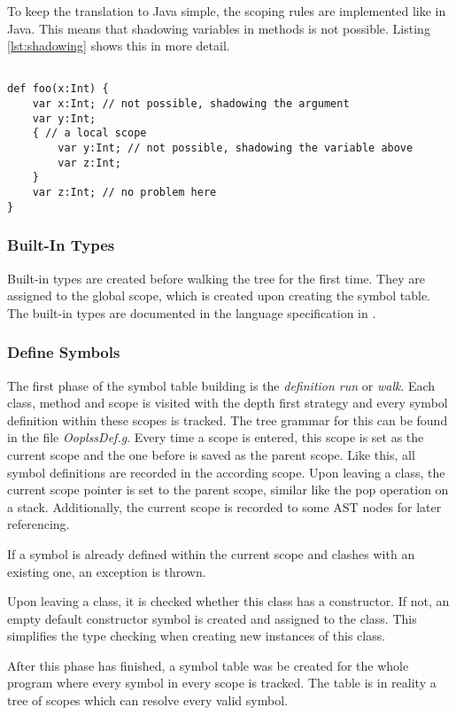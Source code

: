 To keep the translation to Java simple, the scoping rules are implemented
like in Java. This means that shadowing variables in methods is not possible.
Listing \ref{lst:shadowing} shows this in more detail.

\begin{lstlisting}[float=ht,language=ooplss,caption=Shadowing variables,label=lst:shadowing]

def foo(x:Int) {
	var x:Int; // not possible, shadowing the argument
	var y:Int;
	{ // a local scope
		var y:Int; // not possible, shadowing the variable above
		var z:Int;
	}
	var z:Int; // no problem here
}
\end{lstlisting}

\subsubsection{Built-In Types}
Built-in types are created before walking the tree for the first time.
They are assigned to the global scope, which is created upon creating the symbol
table. The built-in types are documented in the language specification in
.

\subsubsection{Define Symbols}
The first phase of the symbol table building is the \emph{definition run}
or \emph{walk}. Each class, method and scope is visited with the
depth first strategy and every symbol definition within these scopes
is tracked. The tree grammar for this can be found in the file
\emph{OoplssDef.g}. Every time a scope is entered, this scope is set
as the current scope and the one before is saved as the parent scope.
Like this, all symbol definitions are recorded in the according scope.
Upon leaving a class, the current scope pointer is set to
the parent scope, similar like the pop operation on a stack.
Additionally, the current scope is recorded to some AST nodes for later
referencing.

If a symbol is already defined within the current scope and clashes with
an existing one, an exception is thrown.

Upon leaving a class, it is checked whether this class has a constructor.
If not, an empty default constructor symbol is created and assigned to the
class. This simplifies the type checking when creating new instances
of this class.

After this phase has finished, a symbol table was be created for the whole
program where every symbol in every scope is tracked. The table is in reality
a tree of scopes which can resolve every valid symbol.

